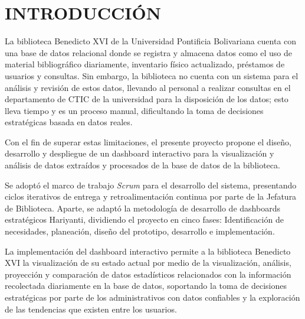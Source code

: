 \documentclass[spanish]{ieee_upb}
\begin{document}


%
%

\newpage
\section{INTRODUCCIÓN}
La biblioteca Benedicto XVI de la Universidad Pontificia Bolivariana cuenta con una base de datos relacional donde se registra y almacena datos como el uso de material bibliográfico diariamente, inventario físico actualizado, préstamos de usuarios y consultas. Sin embargo, la biblioteca no cuenta con un sistema para el análisis y revisión de estos datos, llevando al personal a realizar consultas en el departamento de CTIC de la universidad para la disposición de los datos; esto lleva tiempo y es un proceso manual, dificultando la toma de decisiones estratégicas basada en datos reales. 

\vspace{0.3cm}
Con el fin de superar estas limitaciones, el presente proyecto propone el diseño, desarrollo y despliegue de un dashboard interactivo para la visualización y análisis de datos extraídos y procesados de la base de datos de la biblioteca.

\vspace{0.3cm}
Se adoptó el marco de trabajo \textit{Scrum} para el desarrollo del sistema, presentando ciclos iterativos de entrega y retroalimentación continua por parte de la Jefatura de Biblioteca. Aparte, se adaptó la metodología de desarrollo de dashboards estratégicos Hariyanti, dividiendo el proyecto en cinco fases: Identificación de necesidades, planeación, diseño del prototipo, desarrollo e implementación. 

\vspace{0.3cm}
La implementación del dashboard interactivo permite a la biblioteca Benedicto XVI la visualización de su estado actual  por medio de la visualización, análisis, proyección y comparación de datos estadísticos relacionados con la información recolectada diariamente en la base de datos, soportando la toma de decisiones estratégicas por parte de los administrativos con datos confiables y la exploración de las tendencias que existen entre los usuarios. 
\end{document}
